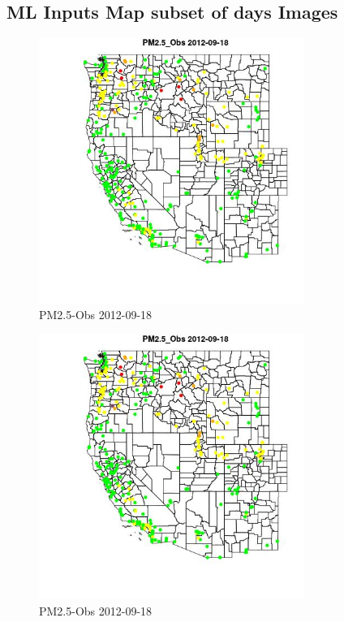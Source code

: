 
\subsection{ML Inputs Map subset of days Images} 
 

\begin{figure} 
\centering  
\includegraphics[width=0.77\textwidth]{Code_Outputs/ML_input_report_ML_input_PM25_Step5_part_d_de_duplicated_aves_ML_input_MapObsPM25_Obs2012-09-18.jpg} 
\caption{\label{fig:ML_input_report_ML_input_PM25_Step5_part_d_de_duplicated_aves_ML_inputMapObsPM25_Obs2012-09-18}PM2.5-Obs 2012-09-18} 
\end{figure} 
 

\begin{figure} 
\centering  
\includegraphics[width=0.77\textwidth]{Code_Outputs/ML_input_report_ML_input_PM25_Step5_part_d_de_duplicated_aves_ML_input_MapObsPM25_Obs2012-09-18.jpg} 
\caption{\label{fig:ML_input_report_ML_input_PM25_Step5_part_d_de_duplicated_aves_ML_inputMapObsPM25_Obs2012-09-18}PM2.5-Obs 2012-09-18} 
\end{figure} 
 

